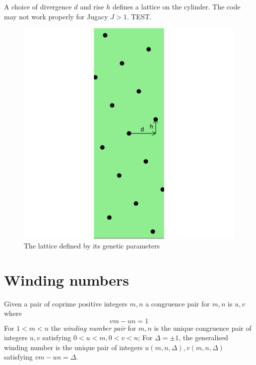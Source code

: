 \documentclass[a4paper]{article}
\begin{document}
A choice of divergence $d$ and rise $h$ defines a lattice on the cylinder.
The code may not work properly for Jugacy $J>1$. TEST.

\begin{center}
\begin{figure}[H]
\includegraphics{figdir/fig-scaledpgtest}
\caption{The lattice defined by its genetic parameters}
\label{fig:latticegenetic}
\end{figure}
\end{center}





\clearpage
\section{Winding numbers}
Given a pair of coprime positive integers $m,n$  a {congruence pair} for $m,n$ is $u,v$ where
\begin{equation}
v m - u n = 1
\label{eq:wnp}
\end{equation}
For $1<m<n$ the \emph{winding number pair} for $m,n$ is the unique congruence pair of integers $u,v$ satisfying $0<u<m,0<v<n$;
For $\Delta=\pm1$, the generalised winding number is the unique pair of integers $u(m,n,\Delta),v(m,n,\Delta)$ satisfying $v m - u n = \Delta$.
\end{document}
